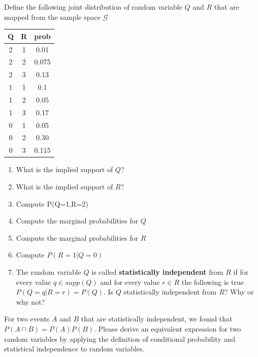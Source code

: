 \begin{enumerate}
    \item  Define the following joint distribution of random variable $Q$ and $R$ that are mapped from the sample space $\mathcal{G}$
    \begin{table}[ht!]
    \centering
    \begin{tabular}{c c | c}
        Q & R & prob \\
        \hline
        2 & 1 & 0.01\\
        2 & 2 & 0.075\\
        2 & 3 & 0.13\\
        1 & 1 & 0.1\\
        1 & 2 & 0.05\\
        1 & 3 & 0.17\\
        0 & 1 & 0.05\\
        0 & 2 & 0.30\\
        0 & 3 & 0.115
    \end{tabular}
    \begin{enumerate}
        \item What is the implied support of $Q$?
        \item What is the implied support of $R$?
        \item Compute P(Q=1,R=2)
        \item Compute the marginal probabilities for $Q$
        \item Compute the marginal probabilities for $R$
        \item Compute $P(R=1 | Q=0)$
        \item The random variable $Q$ is called \textbf{statistically independent} from $R$ if for every value $q \in supp(Q)$ and for every value $r \in R$ the following is true $P(Q=q |R=r) = P(Q)$. Is $Q$ statistically independent from $R$? Why or why not?
    \end{enumerate}
    \item For two events $A$ and $B$ that are statistically independent, we found that $P(A \cap B) = P(A)P(B)$. Please derive an equivalent expression for two random variables by applying the definition of conditional probability and statistical independence to random variables.
\end{table}
    
\end{enumerate}

